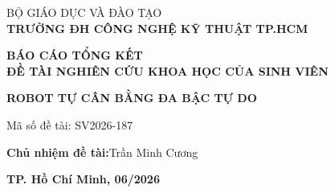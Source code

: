 \documentclass[13pt]{extreport}
\begin{document}
\begin{titlepage}
    \thispagestyle{empty}

    \centering
    \vspace*{1.0cm}

    {\fontsize{13pt}{15pt}\selectfont BỘ GIÁO DỤC VÀ ĐÀO TẠO}\\[0.2cm]
    {\fontsize{14pt}{16pt}\selectfont\bfseries TRƯỜNG ĐH CÔNG NGHỆ KỸ THUẬT TP.HCM}

    \vspace{3.0cm}

    {\fontsize{16pt}{20pt}\selectfont\bfseries BÁO CÁO TỔNG KẾT}\\[0.5cm]
    {\fontsize{14pt}{17pt}\selectfont\bfseries ĐỀ TÀI NGHIÊN CỨU KHOA HỌC CỦA SINH VIÊN}

    \vspace{3.0cm}

    \parbox{12cm}{%
        \centering
        \fontsize{14pt}{18pt}\selectfont\bfseries
        ROBOT TỰ CÂN BẰNG ĐA BẬC TỰ DO
    }

    \vspace{1.0cm}

    {\fontsize{13pt}{15pt}\selectfont Mã số đề tài: SV2026-187}

    \vspace{1.5cm}

    {\fontsize{13pt}{15pt}\selectfont
        \textbf{Chủ nhiệm đề tài:}\quad Trần Minh Cương
    }

    \vspace{6.5cm}

    {\fontsize{13pt}{15pt}\selectfont\bfseries TP. Hồ Chí Minh, 06/2026}

    \vspace{1.0cm}
\end{titlepage}
\end{document}
